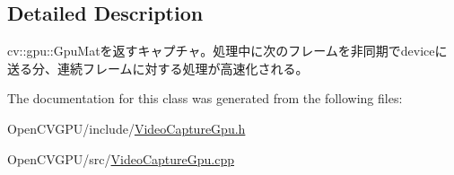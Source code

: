 \subsection{Detailed Description}
cv\+::gpu\+::\+Gpu\+Matを返すキャプチャ。処理中に次のフレームを非同期でdeviceに送る分、連続フレームに対する処理が高速化される。 

The documentation for this class was generated from the following files\+:\begin{DoxyCompactItemize}
\item 
Open\+C\+V\+G\+P\+U/include/\hyperlink{_video_capture_gpu_8h}{Video\+Capture\+Gpu.\+h}\item 
Open\+C\+V\+G\+P\+U/src/\hyperlink{_video_capture_gpu_8cpp}{Video\+Capture\+Gpu.\+cpp}\end{DoxyCompactItemize}

